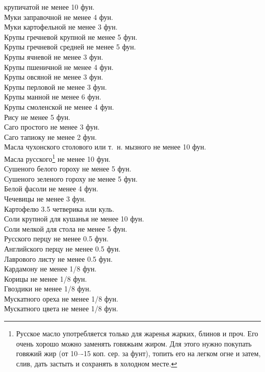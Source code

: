  крупичатой не менее 10 фун.\\
Муки заправочной не менее 4 фун.\\
Муки картофельной не менее 3 фун.\\
Крупы гречневой крупной не менее 5 фун.\\
Крупы гречневой средней не менее 5 фун.\\
Крупы ячневой не менее 3 фун.\\
Крупы пшеничной не менее 4 фун.\\
Крупы овсяной не менее 3 фун.\\
Крупы перловой не менее 3 фун.\\
Крупы манной не менее 6 фун.\\
Крупы смоленской не менее 4 фун.\\
Рису не менее 5 фун.\\
Саго простого не менее 3 фун.\\
Саго тапиоку не менее 2 фун.\\
Масла чухонского столового или т.~н. мызного не менее 10 фун.\\
Масла русского\footnote{Русское масло употребляется только для жаренья жарких, блинов и проч. Его очень хорошо можно заменять говяжьим жиром. Для этого нужно покупать говяжий жир (от 10–-15 коп. сер. за фунт), топить его на легком огне и затем, слив, дать застыть и сохранять в холодном месте.} не менее 10 фун.\\
Сушеного белого гороху не менее 5 фун.\\
Сушеного зеленого гороху не менее 5 фун.\\
Белой фасоли не менее 4 фун.\\
Чечевицы не менее 3 фун.\\
Картофелю 3.5 четверика или куль.\\
Соли крупной для кушанья не менее 10 фун.\\
Соли мелкой для стола не менее 5 фун.\\
Русского перцу не менее 0.5 фун.\\
Английского перцу не менее 0.5 фун.\\
Лаврового листу не менее 0.5 фун.\\
Кардамону не менее 1/8 фун.\\
Корицы не менее 1/8 фун.\\
Гвоздики не менее 1/8 фун.\\
Мускатного ореха не менее 1/8 фун.\\
Мускатного цвета не менее 1/8 фун.\\
